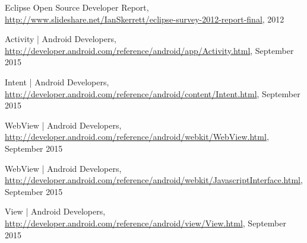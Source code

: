 \begin{thebibliography}{9}
	Eclipse Open Source Developer Report, 
	\url{http://www.slideshare.net/IanSkerrett/eclipse-survey-2012-report-final},
	2012
	
	Activity | Android Developers,
	\url{http://developer.android.com/reference/android/app/Activity.html},
	September 2015
	
	Intent | Android Developers,
	\url{http://developer.android.com/reference/android/content/Intent.html},
	September 2015

	WebView | Android Developers,
	\url{http://developer.android.com/reference/android/webkit/WebView.html},
	September 2015

	WebView | Android Developers,
	\url{http://developer.android.com/reference/android/webkit/JavascriptInterface.html},
	September 2015

	View | Android Developers,
	\url{http://developer.android.com/reference/android/view/View.html},
	September 2015	
\end{thebibliography}